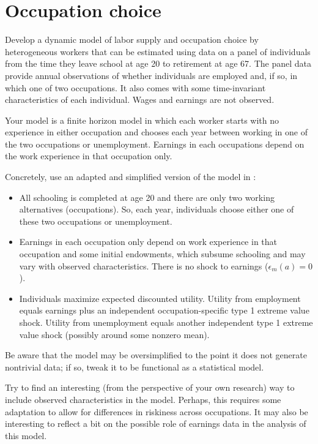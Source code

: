 \documentclass[fleqn,12pt]{article}
\theoremstyle{plain}
\theoremstyle{definition}
\begin{document}
\section*{Occupation choice}

Develop a dynamic model of labor supply and occupation choice by heterogeneous workers that can be estimated using data on a panel of individuals from the time they leave school at age 20 to retirement at age 67. The panel data provide annual observations of whether individuals are employed and, if so, in which one of two occupations. It also comes with some time-invariant characteristics of each individual. Wages and earnings are not observed. 

Your model is a finite horizon model in which each worker starts with no experience in either occupation and chooses each year between working in one of the two occupations or unemployment. Earnings in each occupations depend on the work experience in that occupation only. 

Concretely, use an adapted and simplified version of the model in \citet[][Section I]{doi:10.1086/262080}:
\begin{itemize}
\item All schooling is completed at age 20 and there are only two working alternatives (occupations). So, each year, individuals choose either one of these two occupations or unemployment.
\item Earnings in each occupation only depend on work experience in that occupation and some initial endowments, which subsume schooling and may vary with observed characteristics. There is no shock to earnings ($\epsilon_m(a)=0$).
\item Individuals maximize expected discounted utility. Utility from employment equals earnings plus an independent occupation-specific type 1 extreme value shock. Utility from unemployment equals another independent type 1 extreme value shock (possibly around some nonzero mean).
\end{itemize}
Be aware that the model may be oversimplified to the point it does not generate nontrivial data; if so, tweak it to be functional as a statistical model. 

Try to find an interesting (from the perspective of your own research) way to include observed characteristics in the model. Perhaps, this requires some adaptation to allow for differences in riskiness across occupations. It may also be interesting to reflect a bit on the possible role of earnings data in the analysis of this model.



\end{document}

